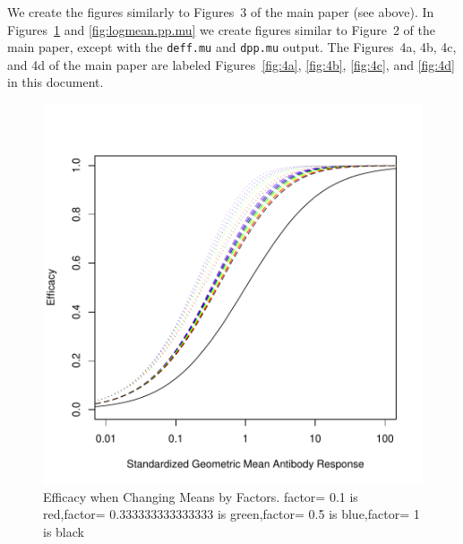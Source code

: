 \documentclass{article}[12pt]
\begin{document}
We create the figures similarly to Figures~3 of the main paper (see above). 
In Figures~\ref{fig:logmean.eff.mu} and \ref{fig:logmean.pp.mu} we create figures similar to Figure~2 of the main 
paper, except with the \texttt{deff.mu} and \texttt{dpp.mu} output. 
The Figures~4a, 4b, 4c, and 4d of the main paper 
are labeled Figures~\ref{fig:4a}, \ref{fig:4b}, \ref{fig:4c}, and \ref{fig:4d}  in this document.


\begin{figure}
\caption{Efficacy when Changing Means by Factors.
factor= 0.1  is  red,factor= 0.333333333333333  is  green,factor= 0.5  is  blue,factor= 1  is  black
 \label{fig:logmean.eff.mu} }
\includegraphics{hbimdetails-figLogmeanEffMu}
\end{figure}
\end{document}
